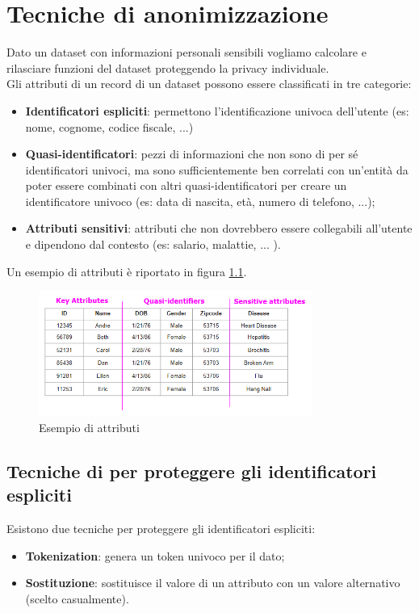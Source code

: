 \chapter{Tecniche di anonimizzazione}
Dato un dataset con informazioni personali sensibili vogliamo calcolare e rilasciare funzioni del dataset proteggendo la privacy individuale.\\

\noindent Gli attributi di un record di un dataset possono essere classificati in tre categorie:
\begin{itemize}
    \item \textbf{Identificatori espliciti}: permettono l'identificazione univoca dell'utente (es: nome, cognome, codice fiscale, ...)
    \item \textbf{Quasi-identificatori}: pezzi di informazioni che non sono di per sé identificatori univoci, ma sono sufficientemente ben correlati con un'entità da poter essere combinati con altri quasi-identificatori per creare un identificatore univoco (es: data di nascita, età, numero di telefono, ...);
    \item \textbf{Attributi sensitivi}: attributi che non dovrebbero essere collegabili all'utente e dipendono dal contesto (es: salario, malattie, ... ).
\end{itemize}

\noindent Un esempio di attributi è riportato in figura \ref{fig:14-1}.

\begin{figure}
    \centering
    \includegraphics[width=0.8\textwidth]{images/14-1.png}
    \caption{Esempio di attributi}
    \label{fig:14-1}
\end{figure}

\section{Tecniche di per proteggere gli identificatori espliciti}
Esistono due tecniche per proteggere gli identificatori espliciti:
\begin{itemize}
    \item \textbf{Tokenization}: genera un token univoco per il dato;
    \item \textbf{Sostituzione}: sostituisce il valore di un attributo con un valore alternativo (scelto casualmente).
\end{itemize}

